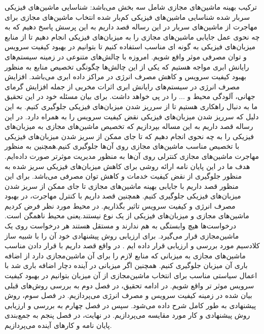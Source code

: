  ترکیب بهینه ماشین‌های مجازی شامل سه بخش می‌باشد:
 شناسایی ماشین‌های فیزیکی سربار شده  
 شناسایی ماشین‌های فیزیکی کم‌بار شده
 انتخاب ماشین‌های مجازی برای مهاجرت از ماشین‌های سربار
   در این رساله قصد داریم به این پرسش پاسخ دهیم که به چه نحوی عمل جایابی ماشین‌های مجازی را به میزبان‌های فیزیکی انجام دهیم تا از منابع میزبان‌های فیزیکی به گونه ای مناسب استفاده کنیم تا بتوانیم در بهبود کیفیت سرویس و توان مصرفی موثر واقع شویم.
 امروزه با چالش‌های متنوعی در زمینه سیستم‌های رایانش ابری مواجه هستیم که یکی از این چالش‌ها چگونگی تخصیص منابع به منظور بهبود کیفیت سرویس و کاهش مصرف انرژی در  مراکز داده ابری می‌باشد. افزایش مصرف انرژی در سیستم‌های رایانش ابری اثرات مخربی از جمله  افزایش گرمای جهانی، آلودگی محیط و ... را در پی خواهد داشت.  برای بیان مسئله خود در این تحقیق ما به دنبال راهکاری هستیم تا از سرریز شدن میزبان‌های فیزیکی جلوگیری کنیم. به این دلیل که سرریز شدن میزبان‌های فیزیکی نقض کیفیت سرویس را به همراه دارد. در این رساله قصد داریم به این مساله بپردازیم که تخصیص ماشین‌های مجازی به میزبان‌های فیزیکی را به چه نحوی انجام دهیم که تا جای ممکن از سریز شدن میزبان‌های فیزیکی با تخصیص مناسب ماشین‌های مجازی روی آن‌ها جلوگیری کنیم.همچنین به منظور مهاجرت ماشین‌های مجازی کنترلی روی آن‌ها به منظور مدیریت موثرتر صورت داده‌ایم.
  هدف ما در این پایان نامه ارائه روشی برای کاهش میزبان‌های فیزیکی سریز شده به منظور جلوگیری از نقض کیفیت خدمات و کاهش توان مصرفی می‌باشد. برای این منظور قصد داریم  با جایابی بهینه ماشین‌های مجازی تا جای ممکن از سریز شدن میزبان‌های فیزیکی جلوگیری کنیم. همچنین قصد داریم با کنترل مهاجرت، در بهبود مصرف انرژی و کیفیت سرویس تاثیر بگذاریم. 
  در محیط مورد نظر فرض کردیم ماشین‌های مجازی و میزبان‌های فیزیکی از یک نوع نیستند.یعنی محیط ناهمگن است.
  درخواست‌ها هیچ وابستگی به هم ندارند و مستقل هستند
  هر درخواست روی یک ماشین‌مجازی قرار می‌گیرد.
 برای ارزیابی روش پیشنهادی خود آن را با شبیه ساز کلادسیم مورد بررسی و ارزیابی قرار داده ایم .
   در واقع قصد داریم با قرار دادن مناسب ماشین‌های مجازی به میزبانی که منابع لازم را برای آن ماشین‌مجازی دارد از اضافه باری آن میزبان جلوگیری کنیم. همچنین اگر میزبانی در آینده دچار اضافه باری شد با اعمال سیاستی مناسب برای انتخاب ماشین‌مجازی از آن میزبان بتوانیم در بهبود کیفیت سرویس موثر تر واقع شویم.
   در ادامه تحقیق، در فصل دوم به بررسی روش‌های قبلی بیان شده در زمینه کیفیت سرویس و مصرف انرژی می‌پردازیم. در فصل سوم، روش پیشنهادی به طور کامل شرح داده می‌شود. سپس در فصل چهارم به بررسی و ارزیابی روش پیشنهادی و کار مورد مقایسه می‌پردازیم. در نهایت، در فصل پنجم به جمع‌­بندی پایان نامه و کارهای آینده می‌پردازیم.
 

